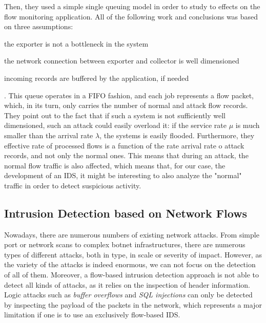 \documentclass[runningheads,a4paper]{llncs}
\begin{document}
Then, they used a simple single queuing model in order to study to effects on the flow monitoring application. All of the following work and conclusions was based on three assumptions: 
\begin{enumerate*}
  \item the exporter is not a bottleneck in the system
  \item the network connection between exporter and collector is well dimensioned
  \item incoming records are buffered by the application, if needed
\end{enumerate*}. This queue operates in a FIFO fashion, and each job represents a flow packet, which, in its turn, only carries the number of normal and attack flow records. They point out to the fact that if such a system is not sufficiently well dimensioned, such an attack could easily overload it: if the service rate $ \mu $ is much smaller than the arrival rate $ \lambda $, the systems is easily flooded. Furthermore, they effective rate of processed flows is a function of the rate arrival rate o attack records, and not only the normal ones. This means that during an attack, the normal flow traffic is also affected, which means that, for our case, the development of an IDS, it might be interesting to also analyze the "normal" traffic in order to detect suspicious activity. 




\subsection{Intrusion Detection based on Network Flows}\label{ssec:detection}

Nowadays, there are numerous numbers of existing network attacks. From simple port or network scans to complex botnet infrastructures, there are numerous types of different attacks, both in type, in scale or severity of impact. However, as the variety of the attacks is indeed enormous, we can not focus on the detection of all of them. Moreover, a flow-based intrusion detection approach is not able to detect all kinds of attacks, as it relies on the inspection of header information. Logic attacks such as \textit{buffer overflows} and \textit{SQL injections} can only be detected by inspecting the payload of the packets in the network, which represents a major limitation if one is to use an exclusively flow-based IDS.
\end{document}
